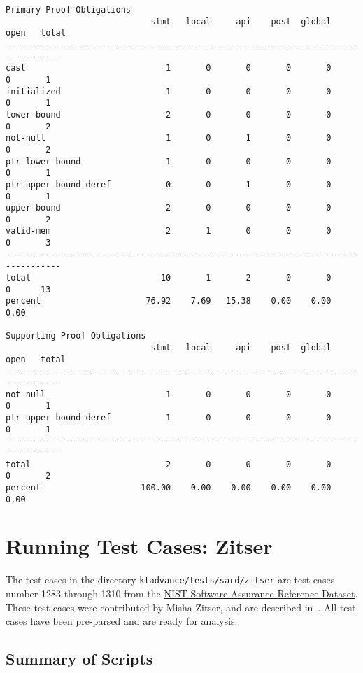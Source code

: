 \documentclass[11pt]{article}
\begin{document}
\begin{scriptsize}
\begin{verbatim}
Primary Proof Obligations
                             stmt   local     api    post  global    open   total
---------------------------------------------------------------------------------
cast                            1       0       0       0       0       0       1
initialized                     1       0       0       0       0       0       1
lower-bound                     2       0       0       0       0       0       2
not-null                        1       0       1       0       0       0       2
ptr-lower-bound                 1       0       0       0       0       0       1
ptr-upper-bound-deref           0       0       1       0       0       0       1
upper-bound                     2       0       0       0       0       0       2
valid-mem                       2       1       0       0       0       0       3
---------------------------------------------------------------------------------
total                          10       1       2       0       0       0      13
percent                     76.92    7.69   15.38    0.00    0.00    0.00

Supporting Proof Obligations
                             stmt   local     api    post  global    open   total
---------------------------------------------------------------------------------
not-null                        1       0       0       0       0       0       1
ptr-upper-bound-deref           1       0       0       0       0       0       1
---------------------------------------------------------------------------------
total                           2       0       0       0       0       0       2
percent                    100.00    0.00    0.00    0.00    0.00    0.00
\end{verbatim}
\end{scriptsize}

\section{Running Test Cases: Zitser}

The test cases in the directory {\tt ktadvance/tests/sard/zitser} 
are test cases number 1283 through 1310 from the \href{http://samate.nist.gov/SRD}{NIST Software Assurance Reference Dataset}. These test cases were contributed by Misha Zitser, and are described  in~\cite{DBLP:conf/sigsoft/ZitserLL04}.
All test cases have been pre-parsed and are ready for analysis.

\subsection{Summary of Scripts}
\end{document}
